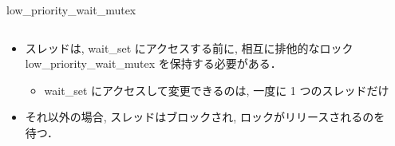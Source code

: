 \begin{frame}{low\_priority\_wait\_mutex}
    \begin{columns}
        \begin{column}{0.6\linewidth}
            \begin{itemize}
                \item スレッドは, wait\_set にアクセスする前に, 相互に排他的なロック \alert{low\_priority\_wait\_mutex} を保持する必要がある．
                      \begin{itemize}
                          \item wait\_set にアクセスして変更できるのは, 一度に 1 つのスレッドだけ
                      \end{itemize}
                \item それ以外の場合, スレッドはブロックされ, ロックがリリースされるのを待つ．
            \end{itemize}
        \end{column}
        \begin{column}{0.4\linewidth}
            \centering
            \vspace{\headerheight}
        \end{column}
    \end{columns}
\end{frame}

